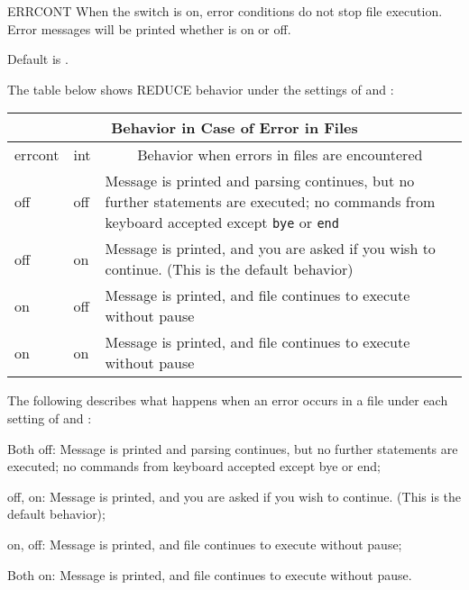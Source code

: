 \begin{Switch}{ERRCONT}
When the  switch is on, error conditions do not stop file
execution.  Error messages will be printed whether  is on or
off.

Default is .

\begin{Comments}
\begin{TEX}
The table below shows REDUCE behavior under the settings of  and
 :

  \begin{center}
  \begin{tabular}{|l|l|p{9.5cm}|}
\hline
\multicolumn{3}{|c|}{Behavior in Case of Error in Files}\\
\hline
\multicolumn{1}{|c|}{errcont} &
  \multicolumn{1}{c|}{int} &
    \multicolumn{1}{c|}{Behavior when errors in files are encountered}\\
\hline
off & off &
Message is printed and parsing continues, but no further statements are 
executed; no commands from keyboard accepted except \verb|bye| or
\verb|end| \\
off & on &
Message is printed, and you are asked if you wish to continue.  (This is the
default behavior) \\
on & off &
Message is printed, and file continues to execute without pause \\
on & on &
Message is printed, and file continues to execute without pause\\
\hline
  \end{tabular}
  \end{center}
\end{TEX}
\begin{INFO}
The following describes what happens when an error occurs in a file under
each setting of  and :

Both off:  Message is printed and parsing continues, but no further
statements are executed; no commands from keyboard accepted except bye or
end;

 off,  on:  Message is printed, and you are asked
if you wish to continue. (This is the default behavior);

 on,  off:  Message is printed, and file continues
to execute without pause;

Both on: Message is printed, and file continues to execute without pause.
\end{INFO}
\end{Comments}
\end{Switch}



